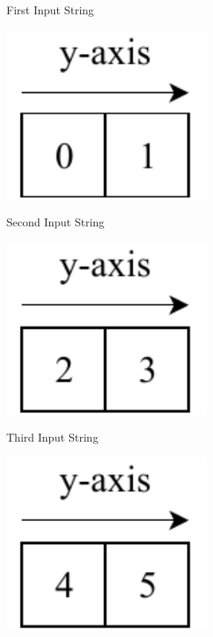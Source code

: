 \documentclass[a4paper, 12pt]{report}
\begin{document}
\begin{tcbraster}[raster columns=3,raster rows=1,
	enhanced,size=small,fit algorithm=hybrid* ]
	\begin{inlinefigure}{First Input String}
		\begin{center}
			\includegraphics[width=0.5\textwidth]{input1}
		\end{center}
	\end{inlinefigure}
	\begin{inlinefigure}{Second Input String}
		\begin{center}
			\includegraphics[width=0.5\textwidth]{input2}
		\end{center}
	\end{inlinefigure}
	\begin{inlinefigure}{Third Input String}
		\begin{center}
			\includegraphics[width=0.5\textwidth]{input3}
		\end{center}
	\end{inlinefigure}
\end{tcbraster}
\end{document}
